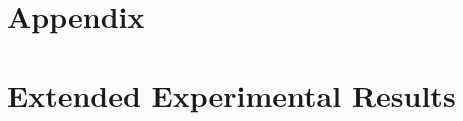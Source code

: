 \documentclass{llmxive}
\begin{document}
















\appendix
\setcounter{page}{1}
\section*{\Large Appendix}






\section{Extended Experimental Results}
\end{document}

